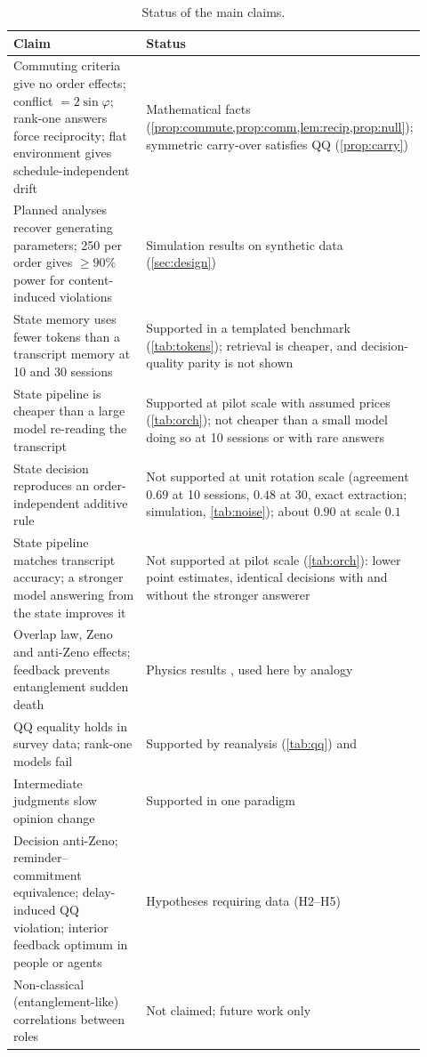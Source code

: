 \documentclass[11pt]{article}
\theoremstyle{definition}
\theoremstyle{remark}
\begin{document}
\begin{table}[t]
\centering
\caption{Status of the main claims.}
\label{tab:claims}
\small
\begin{tabular}{p{0.45\linewidth}p{0.47\linewidth}}
\toprule
Claim & Status\\
\midrule
Commuting criteria give no order effects; conflict $=2\sin\varphi$; rank-one answers force reciprocity; flat environment gives schedule-independent drift & Mathematical facts (\cref{prop:commute,prop:comm,lem:recip,prop:null}); symmetric carry-over satisfies QQ (\cref{prop:carry})\\
Planned analyses recover generating parameters; 250 per order gives $\ge 90\%$ power for content-induced violations & Simulation results on synthetic data (\cref{sec:design})\\
State memory uses fewer tokens than a transcript memory at 10 and 30 sessions & Supported in a templated benchmark (\cref{tab:tokens}); retrieval is cheaper, and decision-quality parity is not shown\\
State pipeline is cheaper than a large model re-reading the transcript & Supported at pilot scale with assumed prices (\cref{tab:orch}); not cheaper than a small model doing so at 10 sessions or with rare answers\\
State decision reproduces an order-independent additive rule & Not supported at unit rotation scale (agreement $0.69$ at 10 sessions, $0.48$ at 30, exact extraction; simulation, \cref{tab:noise}); about $0.90$ at scale $0.1$\\
State pipeline matches transcript accuracy; a stronger model answering from the state improves it & Not supported at pilot scale (\cref{tab:orch}): lower point estimates, identical decisions with and without the stronger answerer\\
Overlap law, Zeno and anti-Zeno effects; feedback prevents entanglement sudden death & Physics results \citep{kofman2005,fischer2001,yamamoto2008pra}, used here by analogy\\
QQ equality holds in survey data; rank-one models fail & Supported by reanalysis (\cref{tab:qq}) and \citet{wang2014}\\
Intermediate judgments slow opinion change & Supported in one paradigm \citep{yearsley2016}\\
Decision anti-Zeno; reminder--commitment equivalence; delay-induced QQ violation; interior feedback optimum in people or agents & Hypotheses requiring data (H2--H5)\\
Non-classical (entanglement-like) correlations between roles & Not claimed; future work only\\
\bottomrule
\end{tabular}
\end{table}
\end{document}
